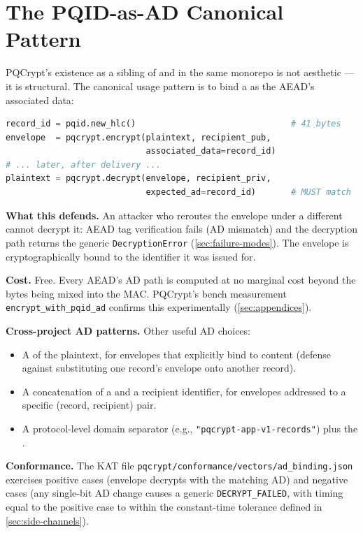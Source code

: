 \section{The PQID-as-AD Canonical Pattern}
\label{sec:ad-binding}

PQCrypt's existence as a sibling of \pqid{} and \pqhash{} in the same monorepo is not aesthetic --- it is structural. The canonical usage pattern is to bind a \pqid{} as the AEAD's associated data:

\begin{lstlisting}[language=Python]
record_id = pqid.new_hlc()                               # 41 bytes
envelope  = pqcrypt.encrypt(plaintext, recipient_pub,
                            associated_data=record_id)
# ... later, after delivery ...
plaintext = pqcrypt.decrypt(envelope, recipient_priv,
                            expected_ad=record_id)       # MUST match
\end{lstlisting}

\textbf{What this defends.} An attacker who reroutes the envelope under a different \pqid{} cannot decrypt it: AEAD tag verification fails (AD mismatch) and the decryption path returns the generic \texttt{DecryptionError} (\cref{sec:failure-modes}). The envelope is cryptographically bound to the identifier it was issued for.

\textbf{Cost.} Free. Every AEAD's AD path is computed at no marginal cost beyond the bytes being mixed into the MAC. PQCrypt's bench measurement \texttt{encrypt\_with\_pqid\_ad} confirms this experimentally (\cref{sec:appendices}).

\textbf{Cross-project AD patterns.} Other useful AD choices:
\begin{itemize}
\item A \pqhash{} of the plaintext, for envelopes that explicitly bind to content (defense against substituting one record's envelope onto another record).
\item A concatenation of a \pqid{} and a recipient identifier, for envelopes addressed to a specific (record, recipient) pair.
\item A protocol-level domain separator (e.g., \texttt{"pqcrypt-app-v1-records"}) plus the \pqid{}.
\end{itemize}

\textbf{Conformance.} The KAT file \texttt{pqcrypt/conformance/vectors/ad\_binding.json} exercises positive cases (envelope decrypts with the matching AD) and negative cases (any single-bit AD change causes a generic \texttt{DECRYPT\_FAILED}, with timing equal to the positive case to within the constant-time tolerance defined in \cref{sec:side-channels}).
